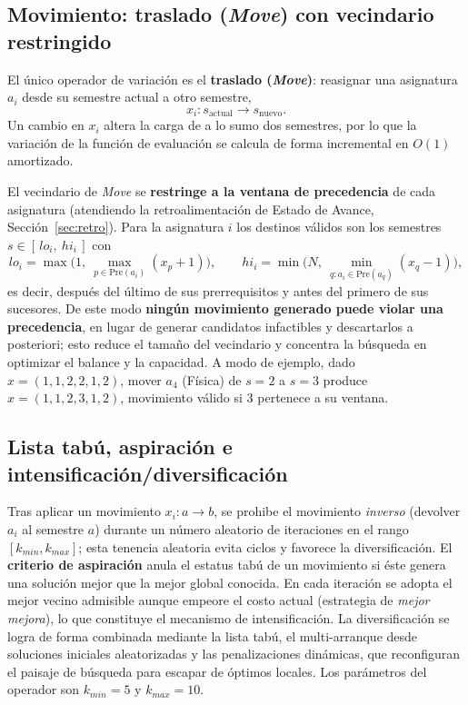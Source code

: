 \documentclass[letter, 10pt]{article}
\begin{document}
\subsection{Movimiento: traslado (\textit{Move}) con vecindario restringido}
\label{sec:mov}
El \'unico operador de variaci\'on es el \textbf{traslado (\textit{Move})}: reasignar una asignatura $a_i$ desde su semestre actual a otro semestre,
$$x_i : s_{\text{actual}} \rightarrow s_{\text{nuevo}}.$$
Un cambio en $x_i$ altera la carga de a lo sumo dos semestres, por lo que la variaci\'on de la funci\'on de evaluaci\'on se calcula de forma incremental en $O(1)$ amortizado.

El vecindario de \textit{Move} se \textbf{restringe a la ventana de precedencia} de cada asignatura (atendiendo la retroalimentaci\'on de Estado de Avance, Secci\'on~\ref{sec:retro}). Para la asignatura $i$ los destinos v\'alidos son los semestres $s \in [\,lo_i,\ hi_i\,]$ con
$$lo_i = \max\Big(1,\ \max_{p \in \text{Pre}(a_i)} (x_p + 1)\Big), \qquad
hi_i = \min\Big(N,\ \min_{q : a_i \in \text{Pre}(a_q)} (x_q - 1)\Big),$$
es decir, despu\'es del \'ultimo de sus prerrequisitos y antes del primero de sus sucesores. De este modo \textbf{ning\'un movimiento generado puede violar una precedencia}, en lugar de generar candidatos infactibles y descartarlos a posteriori; esto reduce el tama\~no del vecindario y concentra la b\'usqueda en optimizar el balance y la capacidad. A modo de ejemplo, dado $x=(1,1,2,2,1,2)$, mover $a_4$ (F\'isica) de $s=2$ a $s=3$ produce $x=(1,1,2,3,1,2)$, movimiento v\'alido si $3$ pertenece a su ventana.

\subsection{Lista tab\'u, aspiraci\'on e intensificaci\'on/diversificaci\'on}
Tras aplicar un movimiento $x_i : a \rightarrow b$, se prohibe el movimiento \emph{inverso} (devolver $a_i$ al semestre $a$) durante un n\'umero aleatorio de iteraciones en el rango $[k_{min}, k_{max}]$; esta tenencia aleatoria evita ciclos y favorece la diversificaci\'on. El \textbf{criterio de aspiraci\'on} anula el estatus tab\'u de un movimiento si \'este genera una soluci\'on mejor que la mejor global conocida. En cada iteraci\'on se adopta el mejor vecino admisible aunque empeore el costo actual (estrategia de \emph{mejor mejora}), lo que constituye el mecanismo de intensificaci\'on. La diversificaci\'on se logra de forma combinada mediante la lista tab\'u, el multi-arranque desde soluciones iniciales aleatorizadas y las penalizaciones din\'amicas, que reconfiguran el paisaje de b\'usqueda para escapar de \'optimos locales. Los par\'ametros del operador son $k_{min}=5$ y $k_{max}=10$.
\end{document}
